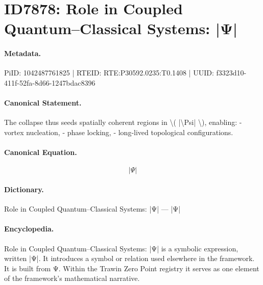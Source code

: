 \section*{ID7878: Role in Coupled Quantum–Classical Systems: |Ψ|}
\paragraph{Metadata.}
PiID: 1042487761825 | RTEID: RTE:P30592.0235:T0.1408 | UUID: f3323d10-411f-52fa-8d66-1247bdac8396

\paragraph{Canonical Statement.}
The collapse thus seeds spatially coherent regions in \textbackslash{}( |\textbackslash{}Psi| \textbackslash{}), enabling: - vortex nucleation, - phase locking, - long-lived topological configurations.

\paragraph{Canonical Equation.}
\[
|\Psi|
\]

\paragraph{Dictionary.}
Role in Coupled Quantum–Classical Systems: |Ψ| — |Ψ|

\paragraph{Encyclopedia.}
Role in Coupled Quantum–Classical Systems: |Ψ| is a symbolic expression, written |Ψ|. It introduces a symbol or relation used elsewhere in the framework. It is built from Ψ. Within the Trawin Zero Point registry it serves as one element of the framework's mathematical narrative.

